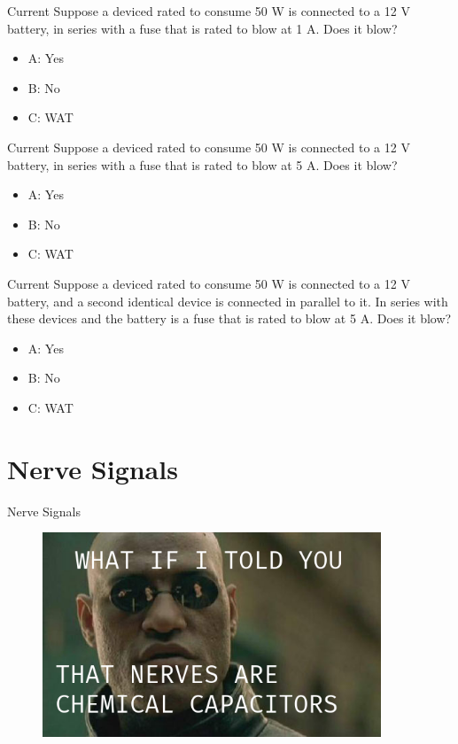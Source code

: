 \documentclass{beamer}
\begin{document}
\begin{frame}{Current}
Suppose a deviced rated to consume 50 W is connected to a 12 V battery, in series with a fuse that is rated to blow at 1 A.  Does it blow?
\begin{itemize}
\item A: Yes
\item B: No
\item C: WAT
\end{itemize}
\end{frame}

\begin{frame}{Current}
Suppose a deviced rated to consume 50 W is connected to a 12 V battery, in series with a fuse that is rated to blow at 5 A.  Does it blow?
\begin{itemize}
\item A: Yes
\item B: No
\item C: WAT
\end{itemize}
\end{frame}

\begin{frame}{Current}
Suppose a deviced rated to consume 50 W is connected to a 12 V battery, and a second identical device is connected in parallel to it.  In series with these devices and the battery is a fuse that is rated to blow at 5 A.  Does it blow?
\begin{itemize}
\item A: Yes
\item B: No
\item C: WAT
\end{itemize}
\end{frame}

\section{Nerve Signals}

\begin{frame}{Nerve Signals}
\begin{figure}
\centering
\includegraphics[width=0.9\textwidth]{figures/Matrix-Morpheus.png}
\end{figure}
\end{frame}
\end{document}
